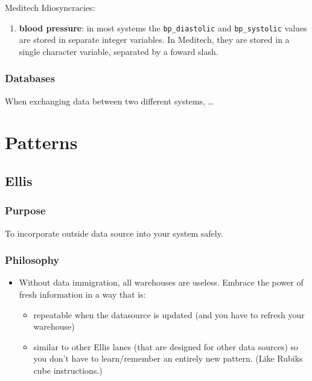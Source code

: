 \documentclass[
]{book}
\providecommand{\tightlist}{%
  \setlength{\itemsep}{0pt}\setlength{\parskip}{0pt}}
\begin{document}
Meditech Idiosyncracies:

\begin{enumerate}
\def\labelenumi{\arabic{enumi}.}
\tightlist
\item
  \textbf{blood pressure}: in most systems the \texttt{bp\_diastolic} and \texttt{bp\_systolic} values are stored in separate integer variables. In Meditech, they are stored in a single character variable, separated by a foward slash.
\end{enumerate}

\hypertarget{data-conventions-database}{%
\subsection{Databases}\label{data-conventions-database}}

When exchanging data between two different systems, \ldots{}

\hypertarget{patterns}{%
\chapter{Patterns}\label{patterns}}

\hypertarget{pattern-ellis}{%
\section{Ellis}\label{pattern-ellis}}

\hypertarget{purpose}{%
\subsection{Purpose}\label{purpose}}

To incorporate outside data source into your system safely.

\hypertarget{philosophy}{%
\subsection{Philosophy}\label{philosophy}}

\begin{itemize}
\tightlist
\item
  Without data immigration, all warehouses are useless. Embrace the power of fresh information in a way that is:

  \begin{itemize}
  \tightlist
  \item
    repeatable when the datasource is updated (and you have to refresh your warehouse)
  \item
    similar to other Ellis lanes (that are designed for other data sources) so you don't have to learn/remember an entirely new pattern. (Like Rubiks cube instructions.)
  \end{itemize}
\end{itemize}
\end{document}
